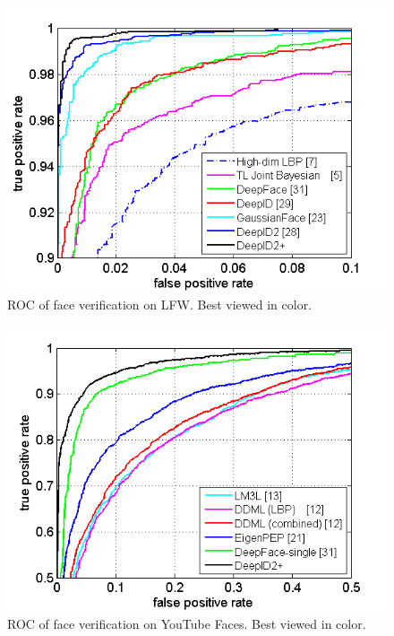 \documentclass[10pt,twocolumn,letterpaper]{article}
\begin{document}
\begin{figure}[!h]
\begin{center}
\includegraphics[width = 0.8\linewidth]{picture/lfw_roc.png}
\end{center}
\vspace{-0.15in}
\caption{ROC  of face verification on LFW. Best viewed in color.}
\label{fig:lfw}
\vspace{-0.1in}
\end{figure}

\begin{figure}[!h]
\begin{center}
\includegraphics[width = 0.8\linewidth]{picture/ytf_roc.png}
\end{center}
\vspace{-0.15in}
\caption{ROC  of face verification on YouTube Faces. Best viewed in color.}
\label{fig:youtube}
\vspace{-0.05in}
\end{figure}
\end{document}
